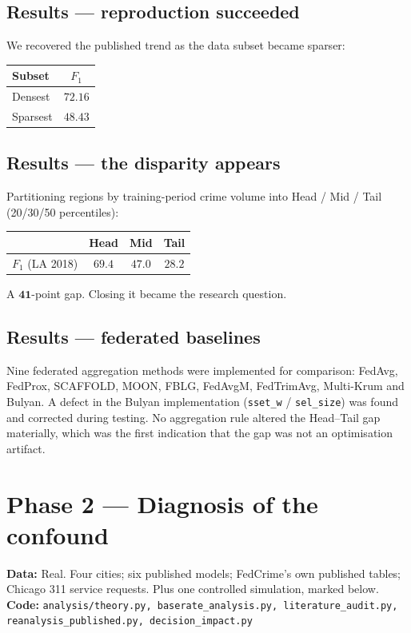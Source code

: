 \documentclass[11pt,a4paper]{article}
\newcommand{\datatag}[2]{%
  \begin{center}\small
  \colorbox{boxbg}{\parbox{0.965\linewidth}{\textbf{Data:} #1 \\ \textbf{Code:} \texttt{#2}}}
  \end{center}}
\begin{document}
\subsection{Results --- reproduction succeeded}
We recovered the published trend as the data subset became sparser:
\begin{center}
\begin{tabular}{lc}
\toprule
Subset & $F_1$ \\
\midrule
Densest & $72.16$ \\
Sparsest & $48.43$ \\
\bottomrule
\end{tabular}
\end{center}

\subsection{Results --- the disparity appears}
Partitioning regions by training-period crime volume into Head / Mid / Tail
(20/30/50 percentiles):
\begin{center}
\begin{tabular}{lccc}
\toprule
& Head & Mid & Tail \\
\midrule
$F_1$ (LA 2018) & $69.4$ & $47.0$ & $\mathbf{28.2}$ \\
\bottomrule
\end{tabular}
\end{center}
\noindent A $\mathbf{41}$-point gap. Closing it became the research question.

\subsection{Results --- federated baselines}
Nine federated aggregation methods were implemented for comparison: FedAvg,
FedProx, SCAFFOLD, MOON, FBLG, FedAvgM, FedTrimAvg, Multi-Krum and Bulyan.
A defect in the Bulyan implementation (\texttt{sset\_w} / \texttt{sel\_size})
was found and corrected during testing. No aggregation rule altered the
Head--Tail gap materially, which was the first indication that the gap was not
an optimisation artifact.

\section{Phase 2 --- Diagnosis of the confound}\label{sec:diagnosis}
\datatag{Real. Four cities; six published models; FedCrime's own published tables; Chicago 311 service requests. Plus one controlled simulation, marked below.}{analysis/theory.py, baserate\_analysis.py, literature\_audit.py, reanalysis\_published.py, decision\_impact.py}
\end{document}

